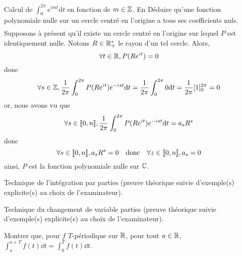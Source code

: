 \documentclass{article}
\begin{document}
\begin{question_kholle}{Calcul de $\displaystyle\int_0^{2\pi}e^{imt} \mathrm d t$ en fonction de $m \in \mathbb Z$. En Déduire qu'une fonction polynomiale nulle sur un cercle centré en l'origine a tous ses coefficients nuls.}
\begin{align*}
    \end{align*}
    Supposons à présent qu'il existe un cercle centré en l'origine sur lequel $P$ est identiquement nulle. Notons $R\in\mathbb R_+^*$ le rayon d'un tel cercle. Alors,
    \[
        \forall t\in\mathbb R, P(Re^{it})=0
    \]
    donc
    \[
        \forall s\in\mathbb Z, \frac{1}{2\pi}\int_0^{2\pi}P(Re^{it})e^{-ist}\mathrm d t = \frac{1}{2\pi}\int_0^{2\pi}0\mathrm d t=\frac{1}{2\pi}[1]_0^{2\pi}=0
    \]
    or, nous avons vu que
    \[
        \forall s\in[\![ 0,n ]\!], \frac{1}{2\pi}\int_0^{2\pi}P(Re^{it})e^{-ist}\mathrm d t = a_s R^s
    \]
    donc
    \[
        \forall s\in[\![ 0,n ]\!], a_sR^s = 0 \quad\text{donc}\quad \forall z\in[\![ 0,n ]\!], a_s = 0
    \]
    ainsi, $P$ est la fonction polynomiale nulle sur $\mathbb C$.
\end{question_kholle}


\pagebreak

\begin{question_kholle}{Technique de l'intégration par parties (preuve théorique suivie d'exemple(s) explicite(s) au choix de l'examinateur).}
\end{question_kholle}

\begin{question_kholle}{Technique du changement de variable parties (preuve théorique suivie d'exemple(s) explicite(s) au choix de l'examinateur).}
\end{question_kholle}

\begin{question_kholle}{Montrer que, pour $f$ $T$-périodique sur $\mathbb R$, pour tout $a\in\mathbb R$, $\displaystyle\int_{a}^{a+T}f(t)\dd t = \int_{0}^{T}f(t)\dd t$.}
\end{question_kholle}
\end{document}
